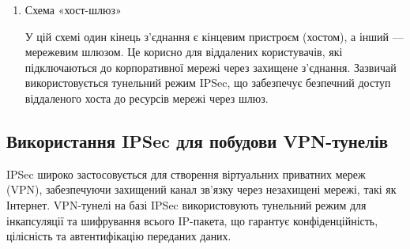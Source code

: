 \begin{enumerate}
    \item Схема «хост-шлюз»
    \par У цій схемі один кінець з'єднання є кінцевим пристроєм (хостом), а інший — мережевим шлюзом. Це корисно для віддалених користувачів, які підключаються до корпоративної мережі через захищене з'єднання. Зазвичай використовується тунельний режим IPSec, що забезпечує безпечний доступ віддаленого хоста до ресурсів мережі через шлюз.
\end{enumerate}

\subsection{Використання IPSec для побудови VPN-тунелів}

IPSec широко застосовується для створення віртуальних приватних мереж (VPN), забезпечуючи захищений канал зв'язку через незахищені мережі, такі як Інтернет. VPN-тунелі на базі IPSec використовують тунельний режим для інкапсуляції та шифрування всього IP-пакета, що гарантує конфіденційність, цілісність та автентифікацію переданих даних.